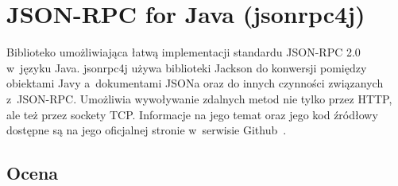 %
%
%



\section{JSON-RPC for Java (jsonrpc4j)}
\label{jsonrpc4j}
Biblioteko umożliwiająca łatwą implementacji standardu JSON-RPC 2.0 w~języku Java.
jsonrpc4j używa biblioteki Jackson do konwersji pomiędzy obiektami Javy a~dokumentami JSONa oraz do innych czynności związanych z~JSON-RPC.
Umożliwia wywoływanie zdalnych metod nie tylko przez HTTP, ale też przez sockety TCP.
Informacje na jego temat oraz jego kod źródłowy dostępne są na jego oficjalnej stronie w~serwisie Github~\cite{jsonrpc4j}.

\subsection{Ocena}

